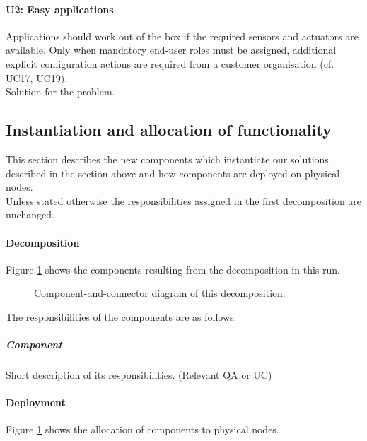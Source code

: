     \paragraph{U2: Easy applications}
        Applications should work out of the box if the required sensors and
        actuators are available. Only when mandatory end-user roles must be
        assigned, additional explicit configuration actions are required
        from a customer organisation (cf. UC17, UC19). \\
        Solution for the problem.


\subsection{Instantiation and allocation of functionality}
    This section describes the new components which instantiate our solutions described
    in the section above and how components are deployed on physical nodes. \\
    Unless stated otherwise the responsibilities assigned in the first decomposition are unchanged.

    \paragraph{Decomposition}
        Figure \ref{fig:FIGURELABEL} shows the components resulting from the
        decomposition in this run.

        \begin{figure}[!h]
        	\centering
        	\caption{Component-and-connector diagram of this decomposition.}
            \label{fig:FIGURELABEL}
        \end{figure}

        The responsibilities of the components are as follows:

    \subparagraph{Component}
        Short description of its responsibilities. (Relevant QA or UC)




    \paragraph{Deployment}
        Figure \ref{fig:FIGURELABEL} shows the allocation of components
        to physical nodes.

